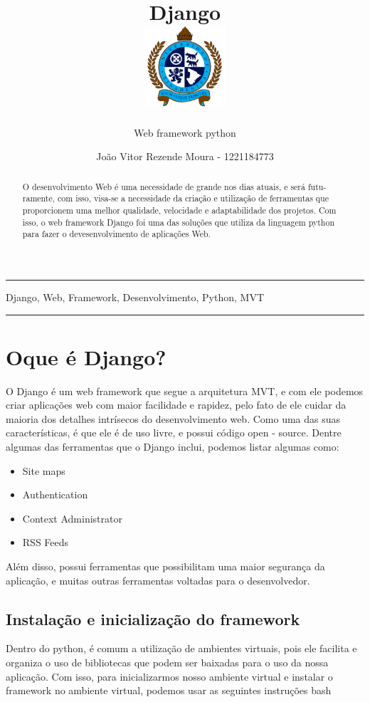 \documentclass[12pt, a4paper]{paper}
\title{Django \\
  \hfill\includegraphics[height=3cm]{../images/universidade.png}
  \vspace{-3cm}
}
\subtitle{Web framework python}
\author{João Vitor Rezende Moura - 1221184773}
\begin{document}
\maketitle
\hrule
\begin{abstract}
  O desenvolvimento Web é uma necessidade de grande nos dias atuais, e será futu-
  ramente, com isso, visa-se a necessidade da criação e utilização de ferramentas que
  proporcionem uma melhor qualidade, velocidade e adaptabilidade dos projetos.
  Com isso, o web framework Django foi uma das soluções que utiliza da linguagem
  python para fazer o devesenvolvimento de aplicações Web.
\end{abstract}

\vspace{-0.6cm}

\begin{keywords}
  Django, Web, Framework, Desenvolvimento, Python, MVT
\end{keywords}

\hrule

\section{Oque é Django?} %
\label{sec:Oque é Django?}
O Django é um web framework que segue a arquitetura MVT, e com ele
podemos criar aplicações web com maior facilidade e rapidez, pelo fato de
ele cuidar da maioria dos detalhes intrísecos do desenvolvimento web. Como
uma das suas características, é que ele é de uso livre, e possui código open -
source.
Dentre algumas das ferramentas que o Django inclui, podemos listar algumas como:

\begin{itemize}
  \item Site maps
  \item Authentication
  \item Context Administrator
  \item RSS Feeds
\end{itemize}

Além disso, possui ferramentas que possibilitam uma maior segurança da
aplicação, e muitas outras ferramentas voltadas para o desenvolvedor.


\subsection{Instalação e inicialização do framework} %
\label{sub:Instalação e inicialização do framework}
Dentro do python, é comum a utilização de ambientes virtuais, pois ele facilita
e organiza o uso de bibliotecas que podem ser baixadas para o uso da nossa
aplicação. Com isso, para inicializarmos nosso ambiente virtual e instalar o
framework no ambiente virtual, podemos usar as seguintes instruções bash
\end{document}
